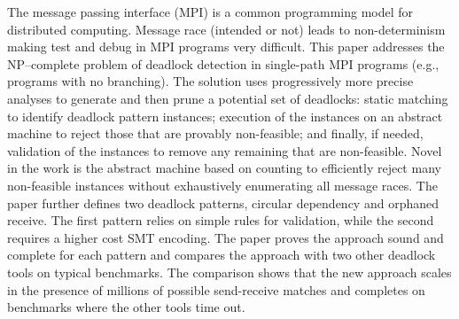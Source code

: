 The message passing interface (MPI) is a common programming model for distributed computing. Message race (intended or not) leads to non-determinism making test and debug in MPI programs very difficult. This paper addresses the NP--complete problem of deadlock detection in single-path MPI programs (e.g., programs with no branching). The solution uses progressively more precise analyses to generate and then prune a potential set of deadlocks: static matching to identify deadlock pattern instances; execution of the instances on an abstract machine to reject those that are provably non-feasible; and finally, if needed, validation of the instances to remove any remaining that are non-feasible. Novel in the work is the abstract machine based on counting to efficiently reject many non-feasible instances without exhaustively enumerating all message races.  The paper further defines two deadlock patterns, circular dependency and orphaned receive. The first pattern relies on simple rules for validation, while the second requires a higher cost SMT encoding. The paper proves the approach sound and complete for each pattern and compares the approach with two other deadlock tools on typical benchmarks. The comparison shows that the new approach scales in the presence of millions of possible send-receive matches and completes on benchmarks where the other tools time out.
